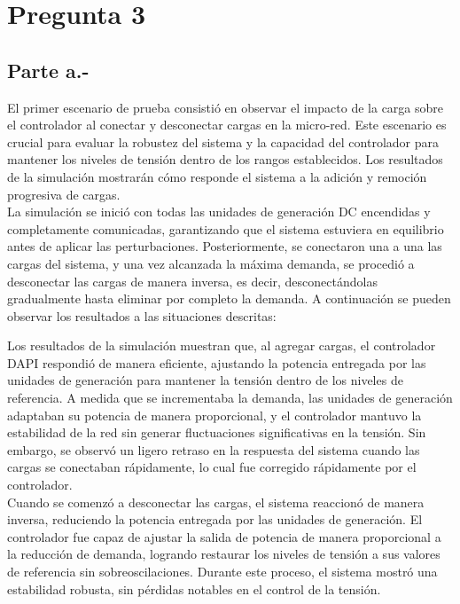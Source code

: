 \section{Pregunta 3}

\subsection{Parte a.-}

El primer escenario de prueba consistió en observar el impacto de la carga sobre el controlador al conectar y desconectar cargas en la micro-red. Este escenario es crucial para evaluar la robustez del sistema y la capacidad del controlador para mantener los niveles de tensión dentro de los rangos establecidos. Los resultados de la simulación mostrarán cómo responde el sistema a la adición y remoción progresiva de cargas.\\

La simulación se inició con todas las unidades de generación DC encendidas y completamente comunicadas, garantizando que el sistema estuviera en equilibrio antes de aplicar las perturbaciones. Posteriormente, se conectaron una a una las cargas del sistema, y una vez alcanzada la máxima demanda, se procedió a desconectar las cargas de manera inversa, es decir, desconectándolas gradualmente hasta eliminar por completo la demanda. A continuación se pueden observar los resultados a las situaciones descritas:


Los resultados de la simulación muestran que, al agregar cargas, el controlador DAPI respondió de manera eficiente, ajustando la potencia entregada por las unidades de generación para mantener la tensión dentro de los niveles de referencia. A medida que se incrementaba la demanda, las unidades de generación adaptaban su potencia de manera proporcional, y el controlador mantuvo la estabilidad de la red sin generar fluctuaciones significativas en la tensión. Sin embargo, se observó un ligero retraso en la respuesta del sistema cuando las cargas se conectaban rápidamente, lo cual fue corregido rápidamente por el controlador.\\

Cuando se comenzó a desconectar las cargas, el sistema reaccionó de manera inversa, reduciendo la potencia entregada por las unidades de generación. El controlador fue capaz de ajustar la salida de potencia de manera proporcional a la reducción de demanda, logrando restaurar los niveles de tensión a sus valores de referencia sin sobreoscilaciones. Durante este proceso, el sistema mostró una estabilidad robusta, sin pérdidas notables en el control de la tensión.

